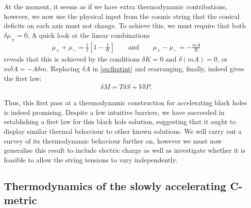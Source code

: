 \documentclass[
twoside,
openright,
frontopenright,
]{dmathesis}
\begin{document}
At the moment, it seems as if we have extra thermodynamic contributions, however,
we now use the physical input from the cosmic string that the conical deficits
on each axis must not change. To achieve this, we must require that both $\delta
\mu_\pm = 0$. A quick look at the linear combinations
\begin{align}
  \mu_+ + \mu_- = \frac12\left[1-\frac{1}{K}\right] \qquad \mbox{and} \qquad \mu_+-\mu_- = -\frac{mA}{K}
\end{align}
reveals that this is achieved by the conditions $\delta K=0$ and
$\delta (mA) = 0$, or $m\delta A = - A \delta m$.  Replacing $\delta A$ in
\cref{eq:firstint} and rearranging, finally, indeed gives the first law:
\begin{align}
\delta M = T \delta S + V \delta P.
\label{eq:firstlawFT}
\end{align}

Thus, this first pass at a thermodynamic construction for accelerating black
holes is indeed promising. Despite a few intuitive barriers, we have succeeded
in establishing a first law for this black hole solution, suggesting that it
ought to display similar thermal behaviour to other known solutions. We will
carry out a survey of its thermodynamic behaviour further on, however we must
now generalise this result to include electric charge as well as investigate whether
it is feasible to allow the string tensions to vary independently. 

\subsection{Thermodynamics of the slowly accelerating C-metric}
\label{sec:cmet-TD-der}
\end{document}
